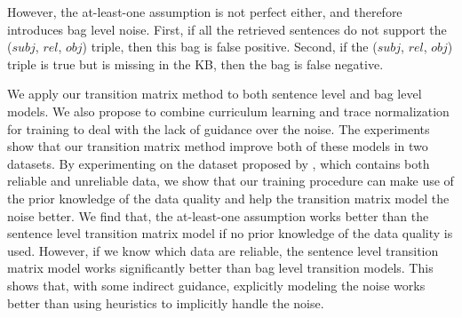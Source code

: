 
However, the at-least-one assumption is not perfect either, and therefore introduces bag level noise. First, if all the retrieved sentences do not support the ($subj$, $rel$, $obj$) triple, then this bag is false positive. Second, if the ($subj$, $rel$, $obj$) triple is true but is missing in the KB, then the bag is false negative.

We apply our transition matrix method to both sentence level and bag level models. We also propose to combine curriculum learning and trace normalization for training to deal with the lack of guidance over the noise. The experiments show that our transition matrix method improve both of these models in two datasets. By experimenting on the dataset proposed by \cite{luo2016temporal}, which contains both reliable and unreliable data, we show that our training procedure can make use of the prior knowledge of the data quality and help the transition matrix model the noise better. We find that, the at-least-one assumption works better than the sentence level transition matrix model if no prior knowledge of the data quality is used. However, if we know which data are reliable, the sentence level transition matrix model works significantly better than bag level transition models. This shows that, with some indirect guidance, explicitly modeling the noise works better than using heuristics to implicitly handle the noise.


